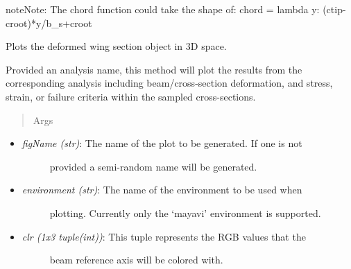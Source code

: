 \documentclass[letterpaper,10pt,english]{sphinxmanual}
\begin{document}
\begin{fulllineitems}
\begin{fulllineitems}
\begin{itemize}
\begin{description}
\end{description}

\end{itemize}

\begin{notice}{note}{Note:}
The chord function could take the shape of: 
chord = lambda y: (ctip-croot)*y/b\_s+croot
\end{notice}

\end{fulllineitems}


\begin{fulllineitems}
\label{structures:AeroComBAT.Structures.WingSection.plotDispl}
Plots the deformed wing section object in 3D space.

Provided an analysis name, this method will plot the results from the
corresponding analysis including beam/cross-section deformation, and
stress, strain, or failure criteria within the sampled cross-sections.
\begin{quote}\begin{description}
\item[{Args}] \leavevmode
\end{description}\end{quote}
\begin{itemize}
\item {} \begin{description}
\item[{\emph{figName (str)}: The name of the plot to be generated. If one is not}] \leavevmode
provided a semi-random name will be generated.

\end{description}

\item {} \begin{description}
\item[{\emph{environment (str)}: The name of the environment to be used when}] \leavevmode
plotting. Currently only the `mayavi' environment is supported.

\end{description}

\item {} \begin{description}
\item[{\emph{clr (1x3 tuple(int))}: This tuple represents the RGB values that the}] \leavevmode
beam reference axis will be colored with.


\end{description}
\end{itemize}
\end{fulllineitems}
\end{fulllineitems}
\end{document}
